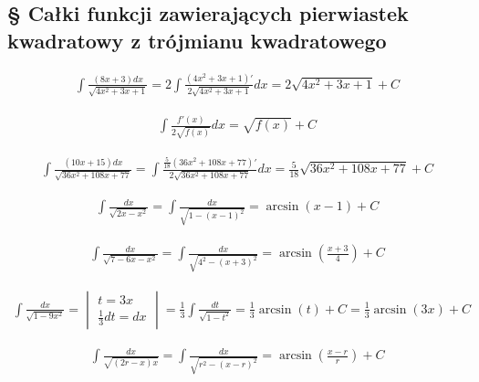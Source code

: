 \subsection{§ Całki funkcji zawierających pierwiastek kwadratowy z trójmianu kwadratowego}



\begin{gather*}\int \frac{(8x+3)dx}{\sqrt{4x^2+3x+1}} = 2\int \frac{(4x^2+3x+1)'}{2\sqrt{4x^2+3x+1}}dx = 2\sqrt{4x^2+3x+1}+C\end{gather*}

  \begin{gather*}\int \frac{f'(x)}{2\sqrt{f(x)}}dx = \sqrt{f(x)}+C\end{gather*}



\begin{gather*}\int \frac{(10x+15)dx}{\sqrt{36x^2+108x+77}} = \int \frac{\frac{5}{18}(36x^2+108x+77)'}{2\sqrt{36x^2+108x+77}}dx = \frac{5}{18}\sqrt{36x^2+108x+77}+C \end{gather*}



\begin{gather*}\int \frac{dx}{\sqrt{2x-x^2}} = \int \frac{dx}{\sqrt{1-(x-1)^2}} = \arcsin (x-1)+C\end{gather*}



\begin{gather*}\int \frac{dx}{\sqrt{7-6x-x^2}} = \int \frac{dx}{\sqrt{4^2-(x+3)^2}} = \arcsin \left( \frac{x+3}{4} \right)+C\end{gather*}



\begin{gather*}\int \frac{dx}{\sqrt{1-9x^2}} = \begin{vmatrix} t=3x \\ \frac{1}{3}dt=dx \end{vmatrix} = \frac{1}{3}\int \frac{dt}{\sqrt{1-t^2}} = \frac{1}{3}\arcsin (t) +C = \frac{1}{3}\arcsin (3x)+C \end{gather*}



\begin{gather*}\int \frac{dx}{\sqrt{(2r-x)x}} = \int \frac{dx}{\sqrt{r^2-(x-r)^2}} = \arcsin \left(\frac{x-r}{r}\right)+C\end{gather*}


